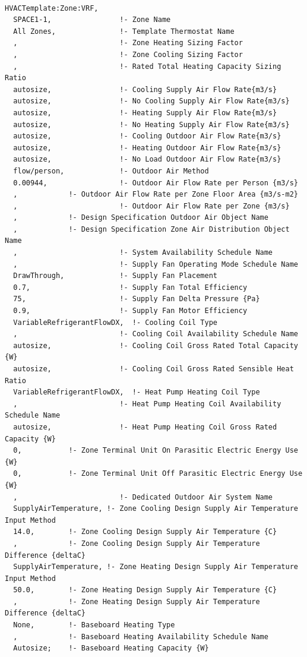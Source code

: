 \begin{lstlisting}

HVACTemplate:Zone:VRF,
  SPACE1-1,                !- Zone Name
  All Zones,               !- Template Thermostat Name
  ,                        !- Zone Heating Sizing Factor
  ,                        !- Zone Cooling Sizing Factor
  ,                        !- Rated Total Heating Capacity Sizing Ratio
  autosize,                !- Cooling Supply Air Flow Rate{m3/s}
  autosize,                !- No Cooling Supply Air Flow Rate{m3/s}
  autosize,                !- Heating Supply Air Flow Rate{m3/s}
  autosize,                !- No Heating Supply Air Flow Rate{m3/s}
  autosize,                !- Cooling Outdoor Air Flow Rate{m3/s}
  autosize,                !- Heating Outdoor Air Flow Rate{m3/s}
  autosize,                !- No Load Outdoor Air Flow Rate{m3/s}
  flow/person,             !- Outdoor Air Method
  0.00944,                 !- Outdoor Air Flow Rate per Person {m3/s}
  ,            !- Outdoor Air Flow Rate per Zone Floor Area {m3/s-m2}
  ,                        !- Outdoor Air Flow Rate per Zone {m3/s}
  ,            !- Design Specification Outdoor Air Object Name
  ,            !- Design Specification Zone Air Distribution Object Name
  ,                        !- System Availability Schedule Name
  ,                        !- Supply Fan Operating Mode Schedule Name
  DrawThrough,             !- Supply Fan Placement
  0.7,                     !- Supply Fan Total Efficiency
  75,                      !- Supply Fan Delta Pressure {Pa}
  0.9,                     !- Supply Fan Motor Efficiency
  VariableRefrigerantFlowDX,  !- Cooling Coil Type
  ,                        !- Cooling Coil Availability Schedule Name
  autosize,                !- Cooling Coil Gross Rated Total Capacity {W}
  autosize,                !- Cooling Coil Gross Rated Sensible Heat Ratio
  VariableRefrigerantFlowDX,  !- Heat Pump Heating Coil Type
  ,                        !- Heat Pump Heating Coil Availability Schedule Name
  autosize,                !- Heat Pump Heating Coil Gross Rated Capacity {W}
  0,           !- Zone Terminal Unit On Parasitic Electric Energy Use {W}
  0,           !- Zone Terminal Unit Off Parasitic Electric Energy Use {W}
  ,                        !- Dedicated Outdoor Air System Name
  SupplyAirTemperature, !- Zone Cooling Design Supply Air Temperature Input Method
  14.0,        !- Zone Cooling Design Supply Air Temperature {C}
  ,            !- Zone Cooling Design Supply Air Temperature Difference {deltaC}
  SupplyAirTemperature, !- Zone Heating Design Supply Air Temperature Input Method
  50.0,        !- Zone Heating Design Supply Air Temperature {C}
  ,            !- Zone Heating Design Supply Air Temperature Difference {deltaC}
  None,        !- Baseboard Heating Type
  ,            !- Baseboard Heating Availability Schedule Name
  Autosize;    !- Baseboard Heating Capacity {W}
\end{lstlisting}

